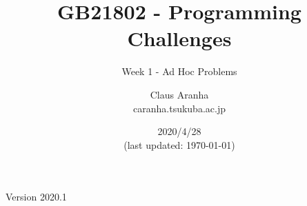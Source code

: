 \documentclass{beamer}
\title[Programming Challenges]{GB21802 - Programming Challenges}
\subtitle[Week 1]{Week 1 - Ad Hoc Problems}
\author[Claus Aranha]{Claus Aranha\\{\footnotesize caranha\@@cs.tsukuba.ac.jp}}
\institute[]{Department of Computer Science}
\date[2020/4/28]{2020/4/28\\{\smaller(last updated: \today)}}
\begin{document}
\begin{CJK}{UTF8}{ipxm}

\begin{frame}
\maketitle
\vfill

\hfill Version 2020.1
\end{frame}





\end{CJK}
\end{document}
